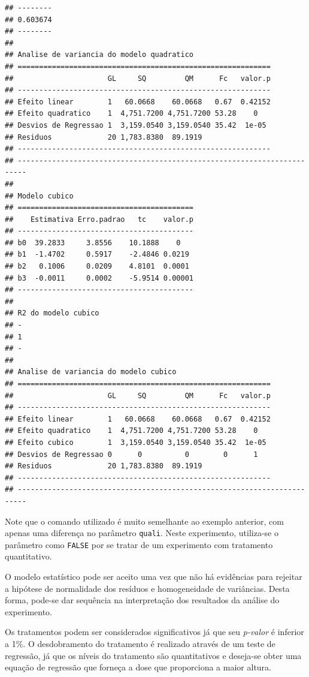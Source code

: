\documentclass[
]{article}
\begin{document}
\begin{verbatim}
## --------
## 0.603674
## --------
## 
## Analise de variancia do modelo quadratico
## ===========================================================
##                      GL     SQ         QM      Fc   valor.p
## -----------------------------------------------------------
## Efeito linear        1   60.0668    60.0668   0.67  0.42152
## Efeito quadratico    1  4,751.7200 4,751.7200 53.28    0   
## Desvios de Regressao 1  3,159.0540 3,159.0540 35.42  1e-05 
## Residuos             20 1,783.8380  89.1919                
## -----------------------------------------------------------
## ------------------------------------------------------------------------
## 
## Modelo cubico
## =========================================
##    Estimativa Erro.padrao   tc    valor.p
## -----------------------------------------
## b0  39.2833     3.8556    10.1888    0   
## b1  -1.4702     0.5917    -2.4846 0.0219 
## b2   0.1006     0.0209    4.8101  0.0001 
## b3  -0.0011     0.0002    -5.9514 0.00001
## -----------------------------------------
## 
## R2 do modelo cubico
## -
## 1
## -
## 
## Analise de variancia do modelo cubico
## ===========================================================
##                      GL     SQ         QM      Fc   valor.p
## -----------------------------------------------------------
## Efeito linear        1   60.0668    60.0668   0.67  0.42152
## Efeito quadratico    1  4,751.7200 4,751.7200 53.28    0   
## Efeito cubico        1  3,159.0540 3,159.0540 35.42  1e-05 
## Desvios de Regressao 0      0          0        0      1   
## Residuos             20 1,783.8380  89.1919                
## -----------------------------------------------------------
## ------------------------------------------------------------------------
\end{verbatim}

Note que o comando utilizado é muito semelhante ao exemplo anterior, com apenas uma diferença no parâmetro \texttt{quali}. Neste experimento, utiliza-se o parâmetro como \texttt{FALSE} por se tratar de um experimento com tratamento quantitativo.

O modelo estatístico pode ser aceito uma vez que não há evidências para rejeitar a hipótese de normalidade dos resíduos e homogeneidade de variâncias. Desta forma, pode-se dar sequência na interpretação dos resultados da análise do experimento.

Os tratamentos podem ser considerados significativos já que seu \emph{p-valor} é inferior a 1\%. O desdobramento do tratamento é realizado através de um teste de regressão, já que os níveis do tratamento são quantitativos e deseja-se obter uma equação de regressão que forneça a dose que proporciona a maior altura.
\end{document}
